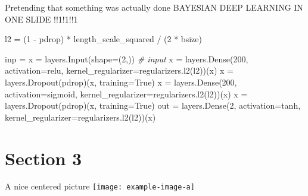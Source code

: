 \documentclass[ignorenonframetext,]{beamer}
\newenvironment{Shaded}{}{}
\newcommand{\CommentTok}[1]{\textcolor[rgb]{0.38,0.63,0.69}{\textit{#1}}}
\newcommand{\DecValTok}[1]{\textcolor[rgb]{0.25,0.63,0.44}{#1}}
\newcommand{\NormalTok}[1]{#1}
\newcommand{\OperatorTok}[1]{\textcolor[rgb]{0.40,0.40,0.40}{#1}}
\newcommand{\StringTok}[1]{\textcolor[rgb]{0.25,0.44,0.63}{#1}}
\newcommand{\VariableTok}[1]{\textcolor[rgb]{0.10,0.09,0.49}{#1}}
\begin{document}
\begin{frame}[fragile]{Pretending that something was actually done}
\protect\hypertarget{pretending-that-something-was-actually-done}{}
BAYESIAN DEEP LEARNING IN ONE SLIDE !!1!1!!1

\begin{Shaded}
\begin{Highlighting}[]
\NormalTok{l2 }\OperatorTok{=}\NormalTok{ (}\DecValTok{1} \OperatorTok{{-}}\NormalTok{ pdrop) }\OperatorTok{*}\NormalTok{ length\_scale\_squared }\OperatorTok{/}\NormalTok{ (}\DecValTok{2} \OperatorTok{*}\NormalTok{ bsize)}

\NormalTok{inp }\OperatorTok{=}\NormalTok{ x }\OperatorTok{=}\NormalTok{ layers.Input(shape}\OperatorTok{=}\NormalTok{(}\DecValTok{2}\NormalTok{,))  }\CommentTok{\# input}
\NormalTok{x }\OperatorTok{=}\NormalTok{ layers.Dense(}\DecValTok{200}\NormalTok{, activation}\OperatorTok{=}\StringTok{\textquotesingle{}relu\textquotesingle{}}\NormalTok{,}
\NormalTok{                 kernel\_regularizer}\OperatorTok{=}\NormalTok{regularizers.l2(l2))(x)}
\NormalTok{x }\OperatorTok{=}\NormalTok{ layers.Dropout(pdrop)(x, training}\OperatorTok{=}\VariableTok{True}\NormalTok{)}
\NormalTok{x }\OperatorTok{=}\NormalTok{ layers.Dense(}\DecValTok{200}\NormalTok{, activation}\OperatorTok{=}\StringTok{\textquotesingle{}sigmoid\textquotesingle{}}\NormalTok{,}
\NormalTok{                 kernel\_regularizer}\OperatorTok{=}\NormalTok{regularizers.l2(l2))(x)}
\NormalTok{x }\OperatorTok{=}\NormalTok{ layers.Dropout(pdrop)(x, training}\OperatorTok{=}\VariableTok{True}\NormalTok{)}
\NormalTok{out }\OperatorTok{=}\NormalTok{ layers.Dense(}\DecValTok{2}\NormalTok{, activation}\OperatorTok{=}\StringTok{\textquotesingle{}tanh\textquotesingle{}}\NormalTok{,}
\NormalTok{                   kernel\_regularizer}\OperatorTok{=}\NormalTok{regularizers.l2(l2))(x)}
\end{Highlighting}
\end{Shaded}
\end{frame}

\hypertarget{section-3}{%
\section{Section 3}\label{section-3}}

\begin{frame}{A nice centered picture}
\protect\hypertarget{a-nice-centered-picture}{}
\centering\texttt{[image: example-image-a]}
\end{frame}
\end{document}
